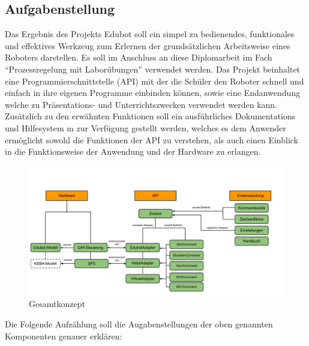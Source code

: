 \subsection{Aufgabenstellung}
Das Ergebnis des Projekts Edubot soll ein simpel zu bedienendes, funktionales und effektives Werkzeug zum Erlernen der grundsätzlichen Arbeitsweise eines Roboters darstellen. Es soll im Anschluss an diese Diplomarbeit im Fach “Prozessregelung mit Laborübungen” verwendet werden. Das Projekt beinhaltet eine Programmierschnittstelle (API) mit der die Schüler den Roboter schnell und einfach in ihre eigenen Programme einbinden können, sowie eine Endanwendung welche zu Präsentations- und Unterrichtszwecken verwendet werden kann.
\\[0.5em]
Zusätzlich zu den erwähnten Funktionen soll ein ausführliches Dokumentations und Hilfesystem m zur Verfügung gestellt werden, welches es dem Anwender ermöglicht sowohl die Funktionen der API zu verstehen, als auch einen Einblick in die Funktionsweise der Anwendung und der Hardware zu erlangen.
\\[0.5em]

\begin{figure}[H]
  \centering
  \begin{minipage}[t]{12 cm}
  	\centering
  	\includegraphics[width=12cm]{images/EdubotSystem} 
    \caption{Gesamtkonzept}
  \end{minipage}
\end{figure}
Die Folgende Aufzählung soll die Augabenstellungen der oben genannten Komponenten genauer erklären:
